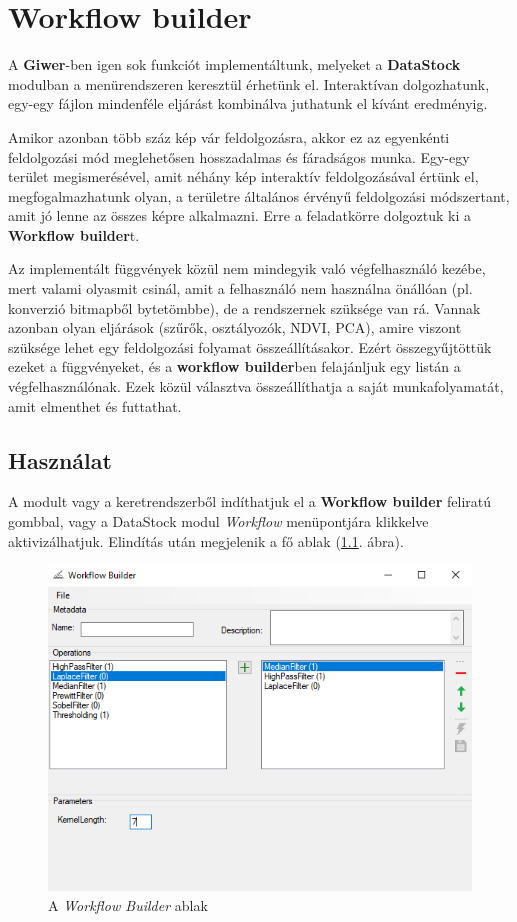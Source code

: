 \documentclass[a4paper,12pt]{book}
\begin{document}
\chapter{Workflow builder}

A \textbf{Giwer}-ben igen sok funkciót implementáltunk, melyeket a \textbf{DataStock} modulban a menürendszeren keresztül érhetünk el. Interaktívan dolgozhatunk, egy-egy fájlon mindenféle eljárást kombinálva juthatunk el kívánt eredményig. 

Amikor azonban több száz kép vár feldolgozásra, akkor ez az egyenkénti feldolgozási mód meglehetősen hosszadalmas és fáradságos munka. Egy-egy terület megismerésével, amit néhány kép interaktív feldolgozásával értünk el, megfogalmazhatunk olyan, a területre általános érvényű feldolgozási módszertant, amit jó lenne az összes képre alkalmazni. Erre a feladatkörre dolgoztuk ki a \textbf{Workflow builder}t.

Az implementált függvények közül nem mindegyik való végfelhasználó kezébe, mert valami olyasmit csinál, amit a felhasználó nem használna önállóan (pl. konverzió bitmapből bytetömbbe), de a rendszernek szüksége van rá. Vannak azonban olyan eljárások (szűrők, osztályozók, NDVI, PCA), amire viszont szüksége lehet egy feldolgozási folyamat összeállításakor. Ezért összegyűjtöttük ezeket a függvényeket, és a \textbf{workflow builder}ben felajánljuk egy listán a végfelhasználónak. Ezek közül választva összeállíthatja a saját munkafolyamatát, amit elmenthet és futtathat.

\section{Használat}

A modult vagy a keretrendszerből indíthatjuk el a \textbf{Workflow builder} feliratú gombbal, vagy a DataStock modul \textit{Workflow} menüpontjára klikkelve aktivizálhatjuk. Elindítás után megjelenik a fő ablak (\ref{fig:workflowmain}. ábra).

	\begin{figure}
	\centering
	\includegraphics[width=12cm]{workflow_main}
	\caption{A \textit{Workflow Builder} ablak}
	\label{fig:workflowmain}
    \end{figure}
\end{document}
